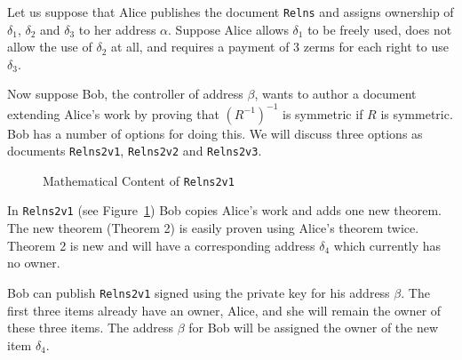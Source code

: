 \documentclass{article}
\begin{document}
Let us suppose that Alice publishes the document {\tt{Relns}}
and assigns ownership of $\delta_1$, $\delta_2$ and $\delta_3$ to her address $\alpha$.
Suppose Alice allows $\delta_1$ to be freely used,
does not allow the use of $\delta_2$ at all,
and requires a payment of 3 zerms for each right to use $\delta_3$.

Now suppose Bob, the controller of address $\beta$, wants to author a document
extending Alice's work by proving that $(R^{-1})^{-1}$ is symmetric
if $R$ is symmetric.
Bob has a number of options for doing this.
We will discuss three options as documents {\tt{Relns2v1}}, {\tt{Relns2v2}} and  {\tt{Relns2v3}}.

\begin{figure}
\begin{center}
\end{center}
\caption{Mathematical Content of {\tt{Relns2v1}}}
\label{fig:docrelns2v1}
\end{figure}
In {\tt{Relns2v1}} (see Figure~\ref{fig:docrelns2v1}) Bob copies Alice's work and adds one new theorem.
The new theorem (Theorem 2) is easily proven using Alice's theorem twice.
Theorem 2 is new and will have a corresponding address $\delta_4$ which currently has no owner.

Bob can publish {\tt{Relns2v1}} signed using the private key for his address $\beta$.
The first three items already have an owner, Alice, and she will remain the owner of these
three items. The address $\beta$ for Bob will be assigned the owner of the new item $\delta_4$.
\end{document}
